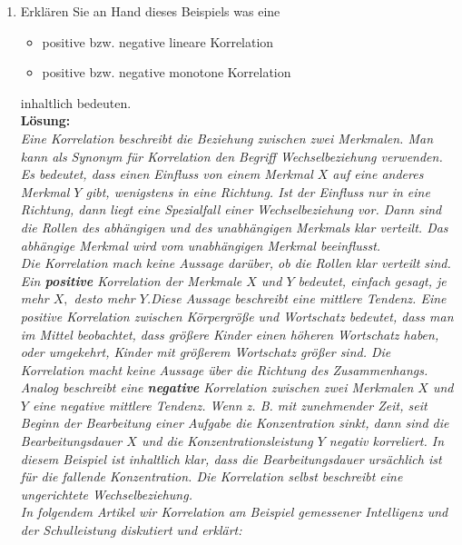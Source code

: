 \documentclass[11pt]{article}
\newcommand{\punkte}[1]{{\small{ }(#1 Punkte)}}
\begin{document}
\begin{enumerate}
\begin{enumerate}
\item{Erklären Sie an Hand dieses Beispiels was eine
\begin{itemize}
\item{positive bzw. negative lineare Korrelation} %
\item{positive bzw. negative monotone Korrelation} %
\end{itemize}
inhaltlich bedeuten.\\
\textbf{Lösung:}\\
\textit{Eine Korrelation beschreibt die Beziehung zwischen zwei Merkmalen. Man kann als 
Synonym für Korrelation den Begriff Wechselbeziehung verwenden. Es bedeutet,
dass einen Einfluss von einem Merkmal $X$ auf eine anderes Merkmal $Y$ gibt,
wenigstens in eine Richtung. Ist der Einfluss nur in eine Richtung, dann liegt
eine Spezialfall einer Wechselbeziehung vor. Dann sind die Rollen des abhängigen
und des unabhängigen Merkmals klar verteilt. Das abhängige Merkmal wird vom unabhängigen
Merkmal beeinflusst.\\ Die Korrelation mach keine Aussage darüber,
ob die Rollen klar verteilt sind.
Ein \textbf{positive} Korrelation der Merkmale $X$ und $Y$ bedeutet, einfach gesagt,
\glqq je mehr $X,$ desto mehr $Y$.\grqq Diese Aussage beschreibt eine mittlere Tendenz.
Eine positive Korrelation zwischen Körpergröße und Wortschatz bedeutet,
dass man im Mittel beobachtet, dass größere Kinder einen höheren Wortschatz haben,
oder umgekehrt, Kinder mit größerem Wortschatz größer sind. Die Korrelation
macht keine Aussage über die Richtung des Zusammenhangs.\\
Analog beschreibt eine \textbf{negative} Korrelation zwischen zwei Merkmalen $X$ und $Y$
eine negative mittlere Tendenz. Wenn z. B. mit zunehmender Zeit, seit 
Beginn der Bearbeitung einer Aufgabe die Konzentration sinkt, dann sind die
Bearbeitungsdauer $X$ und die Konzentrationsleistung $Y$ negativ korreliert.
In diesem Beispiel ist inhaltlich klar, dass die Bearbeitungsdauer ursächlich ist
für die fallende Konzentration. Die Korrelation selbst beschreibt eine
ungerichtete Wechselbeziehung. \\
In folgendem Artikel wir Korrelation
am Beispiel gemessener Intelligenz und der Schulleistung diskutiert und erklärt:\\
}}
\end{enumerate}
\end{enumerate}
\end{document}
